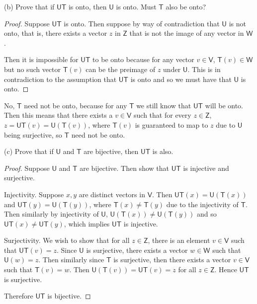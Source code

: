 \documentclass[11pt]{article}
\begin{document}
(b) Prove that if $\mathsf{UT}$ is onto, then $\mathsf{U}$ is onto. Must $\mathsf{T}$ also be onto?

\begin{proof}
    Suppose $\mathsf{UT}$ is onto. Then suppose by way of contradiction that $\mathsf{U}$ is not onto, that is, there exists a vector $z$ in $\mathsf{Z}$ that is not the image of any vector in $\mathsf{W}$. 
    
    Then it is impossible for $\mathsf{UT}$ to be onto because for any vector $v\in\mathsf{V}$, $\mathsf{T}(v)\in\mathsf{W}$ but no such vector $\mathsf{T}(v)$ can be the preimage of $z$ under $\mathsf{U}$. This is in contradiction to the assumption that $\mathsf{UT}$ is onto and so we must have that $\mathsf{U}$ is onto.
\end{proof}

No, $\mathsf{T}$ need not be onto, because for any $\mathsf{T}$ we still know that $\mathsf{UT}$ will be onto. Then this means that there exists a $v\in\mathsf{V}$ such that for every $z\in\mathsf{Z}$, $z = \mathsf{UT}(v) = \mathsf{U}(\mathsf{T}(v))$, where $\mathsf{T}(v)$ is guaranteed to map to $z$ due to $\mathsf{U}$ being surjective, so $\mathsf{T}$ need not be onto.

(c) Prove that if $\mathsf{U}$ and $\mathsf{T}$ are bijective, then $\mathsf{UT}$ is also.

\begin{proof}
    Suppose $\mathsf{U}$ and $\mathsf{T}$ are bijective. Then show that $\mathsf{UT}$ is injective and surjective.

    Injectivity. Suppose $x,y$ are distinct vectors in $\mathsf{V}$. Then $\mathsf{UT}(x) = \mathsf{U}(\mathsf{T}(x))$ and $\mathsf{UT}(y) = \mathsf{U}(\mathsf{T}(y))$, where $\mathsf{T}(x) \neq \mathsf{T}(y)$ due to the injectivity of $\mathsf{T}$. Then similarly by injectivity of $\mathsf{U}$, $\mathsf{U}(\mathsf{T}(x)) \neq \mathsf{U}(\mathsf{T}(y))$ and so $\mathsf{UT}(x) \neq \mathsf{UT}(y)$, which implies $\mathsf{UT}$ is injective.

    Surjectivity. We wish to show that for all $z\in\mathsf{Z}$, there is an element $v\in\mathsf{V}$ such that $\mathsf{UT}(v) = z$. Since $\mathsf{U}$ is surjective, there exists a vector $w\in\mathsf{W}$ such that $\mathsf{U}(w) = z$. Then similarly since $\mathsf{T}$ is surjective, then there exists a vector $v\in\mathsf{V}$ such that $\mathsf{T}(v) = w$. Then $\mathsf{U}(\mathsf{T}(v)) = \mathsf{UT}(v) = z$ for all $z\in\mathsf{Z}$. Hence $\mathsf{UT}$ is surjective.

    Therefore $\mathsf{UT}$ is bijective.
\end{proof}
\end{document}
